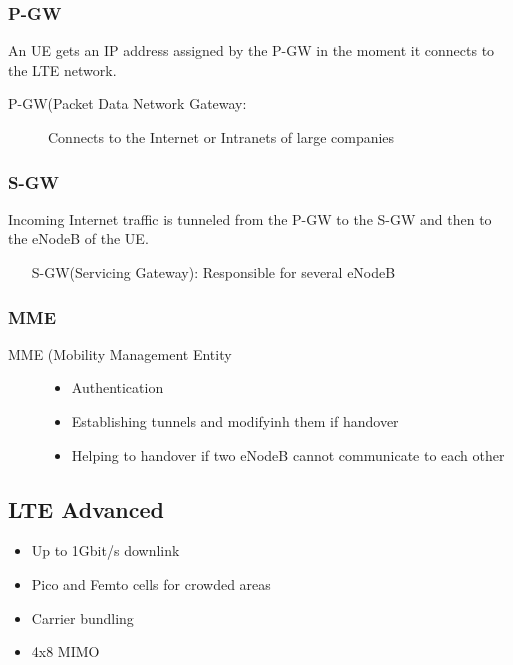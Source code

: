 \subsubsection{P-GW}
An UE gets an IP address assigned by the P-GW in the moment it connects 
to the LTE network.
\begin{description}
	\item[P-GW(Packet Data Network Gateway:] Connects to the Internet
	or Intranets of large companies
\end{description}

\subsubsection{S-GW}
Incoming Internet traffic is tunneled from the P-GW to the S-GW and then to 
the eNodeB of the UE.
\begin{itemize}
	\item[S-GW(Servicing Gateway):] Responsible for several eNodeB
\end{itemize}

\subsubsection{MME}
\begin{description}
	\item[MME (Mobility Management Entity]
	\begin{itemize}
		\item Authentication
		\item Establishing tunnels and modifyinh them if handover
		\item Helping to handover if two eNodeB cannot communicate to each other
	\end{itemize}

\end{description}
\subsection{LTE Advanced}
\begin{itemize}
	\item Up to 1Gbit/s downlink
	\item Pico and Femto cells for crowded areas
	\item Carrier bundling
	\item 4x8 MIMO

\end{itemize}
